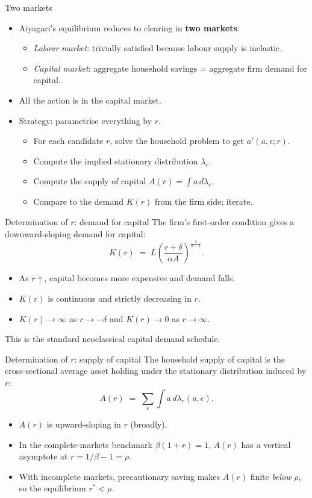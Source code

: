 \documentclass[10pt,english,aspectratio=169]{beamer}
\begin{document}
\begin{frame}{Two markets}
\begin{itemize}
\item Aiyagari's equilibrium reduces to clearing in \textbf{two markets}:
  \begin{itemize}
  \item \emph{Labour market}: trivially satisfied because labour supply is inelastic.
  \item \emph{Capital market}: aggregate household savings = aggregate firm demand for capital.
  \end{itemize}
\medskip
\item All the action is in the capital market.
\medskip
\item Strategy: parametrise everything by $r$.
  \begin{itemize}
  \item For each candidate $r$, solve the household problem to get $a'(a,\epsilon;r)$.
  \item Compute the implied stationary distribution $\lambda_r$.
  \item Compute the supply of capital $A(r) = \int a\,d\lambda_r$.
  \item Compare to the demand $K(r)$ from the firm side; iterate.
  \end{itemize}
\end{itemize}
\end{frame}

\begin{frame}{Determination of $r$: demand for capital}
The firm's first-order condition gives a downward-sloping demand for capital:
\[
K(r) \;=\; L \left( \frac{r + \delta}{\alpha A} \right)^{\frac{1}{\alpha-1}}.
\]
\medskip
\begin{itemize}
\item As $r \uparrow$, capital becomes more expensive and demand falls.
\item $K(r)$ is continuous and strictly decreasing in $r$.
\item $K(r) \to \infty$ as $r \to -\delta$ and $K(r) \to 0$ as $r \to \infty$.
\end{itemize}
\medskip
This is the standard neoclassical capital demand schedule.
\end{frame}

\begin{frame}{Determination of $r$: supply of capital}
The household supply of capital is the cross-sectional average asset holding under the stationary distribution induced by $r$:
\[
A(r) \;=\; \sum_{\epsilon} \int a \, d\lambda_r(a,\epsilon).
\]
\medskip
\begin{itemize}
\item $A(r)$ is upward-sloping in $r$ (broadly).
\item In the complete-markets benchmark $\beta(1+r)=1$, $A(r)$ has a vertical asymptote at $r = 1/\beta-1=\rho$.
\item With incomplete markets, precautionary saving makes $A(r)$ finite \emph{below} $\rho$, so the equilibrium $r^* < \rho$.
\end{itemize}
\end{frame}
\end{document}
